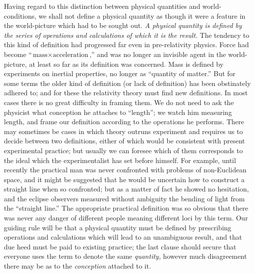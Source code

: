 \documentclass[12pt]{book}
\begin{document}
Having regard to this distinction between physical quantities and world\hyp{}conditions,
we shall not define a physical quantity as though it were a feature
in the world\hyp{}picture which had to be sought out. \emph{A physical quantity is
defined by the series of operations and calculations of which it is the result.}
The tendency to this kind of definition had progressed far even in pre\hyp{}relativity
physics. Force had become ``$\text{mass} \times \text{acceleration}$,'' and was no longer an invisible
agent in the world\hyp{}picture, at least so far as its definition was concerned.
Mass is defined by experiments on inertial properties, no longer as ``quantity
of matter.'' But for some terms the older kind of definition (or lack of
definition) has been obstinately adhered to; and for these the relativity
theory must find new definitions. In most cases there is no great difficulty
in framing them. We do not need to ask the physicist what conception
he attaches to ``length''; we watch him measuring length, and frame our
definition according to the operations he performs. There may sometimes be
cases in which theory outruns experiment and requires us to decide between
two definitions, either of which would be consistent with present experimental
practice; but usually we can foresee which of them corresponds to the ideal
which the experimentalist has set before himself. For example, until recently
the practical man was never confronted with problems of non\hyp{}Euclidean space,
and it might be suggested that he would be uncertain how to construct a
straight line when so confronted; but as a matter of fact he showed no
hesitation, and the eclipse observers measured without ambiguity the bending
of light from the ``straight line.'' The appropriate practical definition was so
obvious that there was never any danger of different people meaning different
loci by this term. Our guiding rule will be that a physical quantity must be
defined by prescribing operations and calculations which will lead to an
unambiguous result, and that due heed must be paid to existing practice;
the last clause should secure that everyone uses the term to denote the same
\emph{quantity,} however much disagreement there may be as to the \emph{conception}
attached to it.
\end{document}
